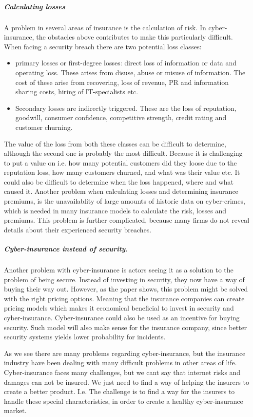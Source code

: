 \subparagraph{Calculating losses} A problem in several areas of insurance is the calculation of risk. In cyber-insurance, the obstacles above contributes to make this particularly difficult. When facing a security breach there are two potential loss classes:\cite{bandyopadhyay2009managers,mehr1980principles} 
\begin{itemize}
\item primary losses or first-degree losses: direct loss of information or data and operating loss. 
These arises from disuse, abuse or misuse of information.
 The cost of these arise from recovering, loss of revenue, 
 PR and information sharing costs, hiring of IT-specialists etc.
 \item Secondary losses are indirectly triggered. These are the loss of reputation, goodwill, 
consumer confidence, competitive strength, credit rating and customer churning. 
\end{itemize}
The value of the loss from both these classes can be difficult to determine, although the second one is probably the most difficult. Because it is challenging to put a value on i.e. how many potential customers did they loose due to the reputation loss, how many customers churned, and what was their value etc.
It could also be difficult to determine when the loss happened, where and what caused it.
Another problem when calculating losses and determining insurance premiums, is the unavailablity of large amounts of historic data on cyber-crimes, which is needed in many insurance models to calculate the risk, losses and premiums. This problem is further complicated, because many firms do not reveal details about their experienced security breaches. \cite{herath2007cyber}

\subparagraph{Cyber-insurance instead of security.}
Another problem with cyber-insurance is actors seeing it as a solution to the problem of being secure. Instead of investing in security, they now have a way of buying their way out. 
However, as the paper \cite{bolot2008cyber} shows, this problem might be solved with the right pricing options. Meaning that the insurance companies can create pricing models which makes it economical beneficial to invest in security and cyber-insurance. Cyber-insurance could also be used as an incentive for buying security. Such model will also make sense for the insurance company, since better security systems yields lower probability for incidents.

As we see there are many problems regarding cyber-insurance, but the insurance industry have been dealing with many difficult problems in other areas of life. Cyber-insurance faces many challenges, but we cant say that internet risks and damages can not be insured. We just need to find a way of helping the insurers to create a better product. I.e. The challenge is to find a way for the insurers to handle these special characteristics, in order to create a healthy cyber-insurance market. \cite{lelarge2009economic}
